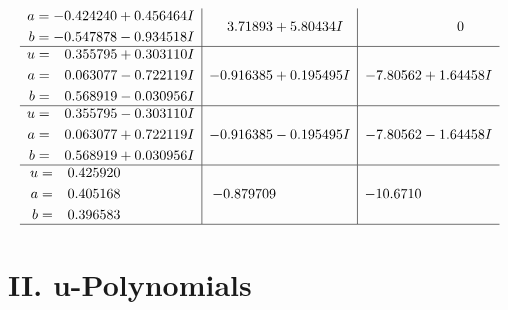 \documentclass[1p]{elsarticle_modified}
\theoremstyle{definition}
\begin{document}
$$\begin{array}{c|c|c}
\begin{aligned}
a &= -0.424240 + 0.456464 I \\
b &= -0.547878 - 0.934518 I\end{aligned}
 & \phantom{-}3.71893 + 5.80434 I & \phantom{-0.000000 } 0 \\ \hline\begin{aligned}
u &= \phantom{-}0.355795 + 0.303110 I \\
a &= \phantom{-}0.063077 - 0.722119 I \\
b &= \phantom{-}0.568919 - 0.030956 I\end{aligned}
 & -0.916385 + 0.195495 I & -7.80562 + 1.64458 I \\ \hline\begin{aligned}
u &= \phantom{-}0.355795 - 0.303110 I \\
a &= \phantom{-}0.063077 + 0.722119 I \\
b &= \phantom{-}0.568919 + 0.030956 I\end{aligned}
 & -0.916385 - 0.195495 I & -7.80562 - 1.64458 I \\ \hline\begin{aligned}
u &= \phantom{-}0.425920\phantom{ +0.000000I} \\
a &= \phantom{-}0.405168\phantom{ +0.000000I} \\
b &= \phantom{-}0.396583\phantom{ +0.000000I}\end{aligned}
 & -0.879709\phantom{ +0.000000I} & -10.6710\phantom{ +0.000000I}\\
 \hline 
 \end{array}$$\newpage
\newpage\renewcommand{\arraystretch}{1}
\centering \section*{ II. u-Polynomials}
\end{document}
